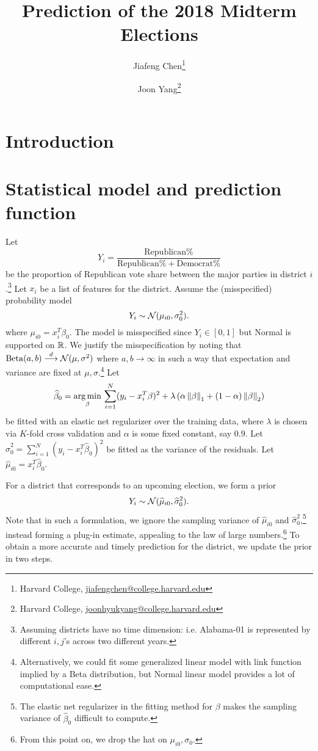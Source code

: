 \documentclass[11pt]{article}
\title{Prediction of the 2018 Midterm Elections}
\author{Jiafeng Chen\thanks{Harvard College, \url{jiafengchen@college.harvard.edu}} \and Joon Yang\thanks{Harvard College, \url{joonhyukyang@college.harvard.edu}}}
\begin{document}
\maketitle
\section{Introduction}

\section{Statistical model and prediction function}
Let \[Y_i = \frac{\text{Republican}\%}{\text{Republican}\% + \text{Democrat}\%}\] be the proportion of Republican vote share between the major parties in district $i$.\footnote{Assuming districts have no time dimension: i.e. Alabama-01 is represented by different $i,j$'s across two different years.} Let $x_i$ be a list of features for the district. Assume the (misspecified) probability model \[
Y_i \sim \mathcal{N}(\mu_{i0}, \sigma_0^2).
\]
where $\mu_{i0} = x_i^T \beta_0$. The model is misspecified since $Y_i \in [0,1]$ but Normal is supported on $\mathbb{R}$. We justify the misspecification by noting that $\operatorname{Beta}(a,b) \overset{d}{\longrightarrow} \mathcal{N}(\mu,\sigma^2)$ where $a, b \to \infty$ in such a way that expectation and variance are fixed at $\mu,\sigma$.\footnote{Alternatively, we could fit some generalized linear model with link function implied by a Beta distribution, but Normal linear model provides a lot of computational ease.}
Let \begin{align*}
\widehat \beta_0 = \operatorname*{arg\,min}_\beta \, \sum_{i=1}^{N} (y_i - x_i^T \beta)^2 + \lambda\left({\alpha \left\lVert\beta\right\rVert_1 + (1-\alpha) \left\lVert\beta\right\rVert_2}\right)
\end{align*}
be fitted with an elastic net regularizer over the training data, where $\lambda$ is chosen via $K$-fold cross validation and $\alpha$ is some fixed constant, say $0.9$. Let $\hat \sigma_0^2 = \sum_{i=1}^N (y_i - x_i^T \hat\beta_0)^2$ be fitted as the variance of the residuals. Let $\hat \mu_{i0} = x_i^T \hat \beta_0$. 

For a district that corresponds to an upcoming election, we form a prior \[Y_i \sim \mathcal{N}(\widehat \mu_{i0}, \widehat \sigma_0^2).\]
Note that in such a formulation, we ignore the sampling variance of $\hat \mu_{i0}$ and $\hat \sigma_0^2$,\footnote{The elastic net regularizer in the fitting method for $\beta$ makes the sampling variance of $\hat\beta_0$ difficult to compute.} instead forming a plug-in estimate, appealing to the law of large numbers.\footnote{From this point on, we drop the hat on $\mu_{i0}, \sigma_0$.} To obtain a more accurate and timely prediction for the district, we update the prior in two steps.  
\end{document}
